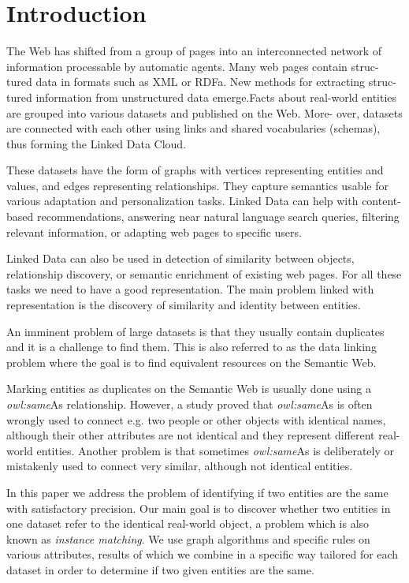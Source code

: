 \documentclass{llncs}
\begin{document}
\section{Introduction}

 
\normalsize The Web has shifted from a group of pages into an interconnected network of
information processable by automatic agents. Many web pages contain struc-
tured data in formats such as XML or RDFa. New methods for extracting struc-
tured information from unstructured data emerge\cite{2,16}.Facts about real-world
entities are grouped into various datasets and published on the Web. More-
over, datasets are connected with each other using links and shared vocabularies
(schemas), thus forming the Linked Data Cloud.

These datasets have the form of graphs with vertices representing entities
and values, and edges representing relationships. They capture semantics usable
for various adaptation and personalization tasks. Linked Data can help with 
content-based recommendations, answering near natural language search queries,
filtering relevant information, or adapting web pages to specific users.

Linked Data can also be used in detection of similarity between objects,
relationship discovery, or semantic enrichment of existing web pages. For all these
tasks we need to have a good representation\cite{7}. The main problem linked with
representation is the discovery of similarity and identity between entities\cite{18}.

An imminent problem of large datasets is that they usually contain duplicates
and it is a challenge to find them. This is also referred to as the data linking
problem where the goal is to find equivalent resources on the Semantic Web\cite{5}.

Marking entities as duplicates on the Semantic Web is usually done using a
\textit{owl:same}As relationship. However, a study\cite{6} proved that \textit{owl:same}As is often
wrongly used to connect e.g. two people or other objects with identical names,
although their other attributes are not identical and they represent different real-
world entities. Another problem is that sometimes \textit{owl:same}As is deliberately or
mistakenly used to connect very similar, although not identical entities.

In this paper we address the problem of identifying if two entities are the same
with satisfactory precision. Our main goal is to discover whether two entities in
one dataset refer to the identical real-world object, a problem which is also
known as \textit{instance matching}. We use graph algorithms and specific rules on
various attributes, results of which we combine in a specific way tailored for
each dataset in order to determine if two given entities are the same.
\end{document}
